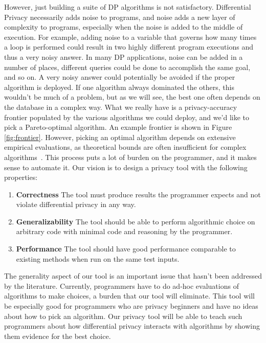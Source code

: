 \documentclass[11pt]{report}
\begin{document}
However, just building a suite of DP algorithms is not satisfactory. Differential Privacy necessarily adds noise to programs, and noise adds a new layer of complexity to programs, especially when the noise is added to the middle of execution. For example, adding noise to a variable that governs how many times a loop is performed could result in two highly different program executions and thus a very noisy answer. In many DP applications, noise can be added in a number of places, different queries could be done to accomplish the same goal, and so on. A very noisy answer could potentially be avoided if the proper algorithm is deployed. If one algorithm always dominated the others, this wouldn't be much of a problem, but as we will see, the best one often depends on the database in a complex way. What we really have is a privacy-accuracy frontier populated by the various algorithms we could deploy, and we'd like to pick a Pareto-optimal algorithm. An example frontier is shown in Figure \ref{fig:frontier}. However, picking an optimal algorithm depends on extensive empirical evaluations, as theoretical bounds are often insufficient for complex algorithms~\cite{Hay:2016}. This process puts a lot of burden on the programmer, and it makes sense to automate it. Our vision is to design a privacy tool with the following properties:
\begin{enumerate}
\item \textbf{Correctness} The tool must produce results the programmer expects and not violate differential privacy in any way.
\item \textbf{Generalizability} The tool should be able to perform algorithmic choice on arbitrary code with minimal code and reasoning by the programmer.
\item \textbf{Performance} The tool should have good performance comparable to existing methods when run on the same test inputs.
\end{enumerate}

The generality aspect of our tool is an important issue that hasn't been addressed by the literature. Currently, programmers have to do ad-hoc evaluations of algorithms to make choices, a burden that our tool will eliminate. This tool will be especially good for programmers who are privacy beginners and have no ideas about how to pick an algorithm. Our privacy tool will be able to teach such programmers about how differential privacy interacts with algorithms by showing them evidence for the best choice.
\end{document}
